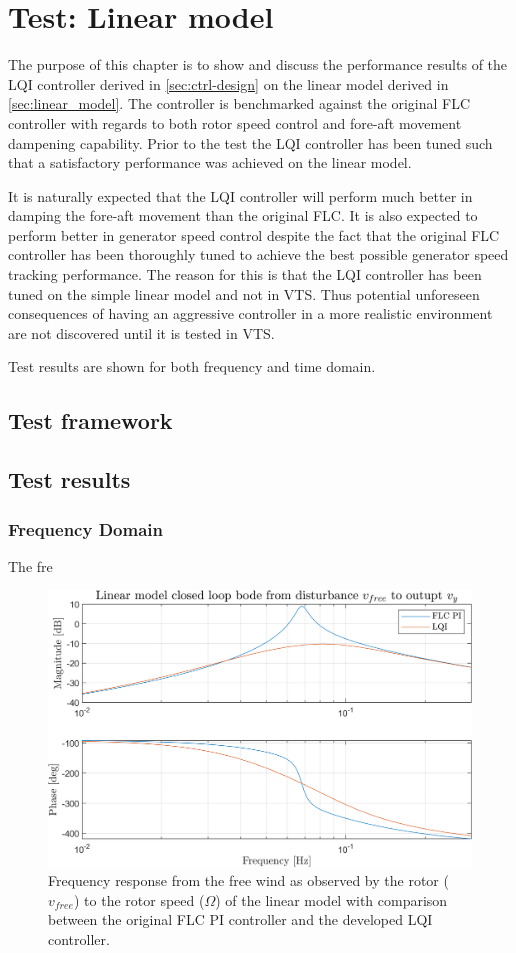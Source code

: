 \section{Test: Linear model}
The purpose of this chapter is to show and discuss the performance results of the LQI controller derived in \cref{sec:ctrl-design} on the linear model derived in \cref{sec:linear_model}. The controller is benchmarked against the original FLC controller with regards to both rotor speed control and fore-aft movement dampening capability. Prior to the test the LQI controller has been tuned such that a satisfactory performance was achieved on the linear model. 

It is naturally expected that the LQI controller will perform much better in damping the fore-aft movement than the original FLC. It is also expected to perform better in generator speed control despite the fact that the original FLC controller has been thoroughly tuned to achieve the best possible generator speed tracking performance. The reason for this is that the LQI controller has been tuned on the simple linear model and not in VTS. Thus potential unforeseen consequences of having an aggressive controller in a more realistic environment are not discovered until it is tested in VTS.

Test results are shown for both frequency and time domain.

\subsection{Test framework}



\subsection{Test results}

\subsubsection{Frequency Domain}
The fre

\begin{figure}[ht]
	\centering
	\includegraphics[width=0.7\linewidth]{Graphics/TestResults/linearModPerf/10_vfreeTovy.png}
	\caption{Frequency response from the free wind as observed by the rotor ($ v_{free} $) to the rotor speed  ($ \Omega $) of the linear model with comparison between the original FLC PI controller and the developed LQI controller.}
	\label{fig:10_vfreeTovy}
\end{figure}


